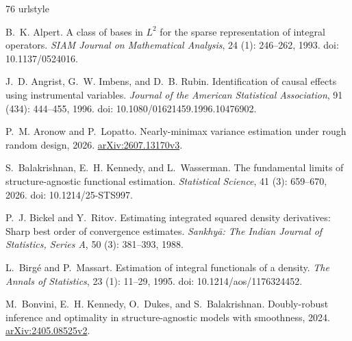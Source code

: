 \documentclass[12pt,oneside,openany]{book}
\numberwithin{equation}{chapter}
\theoremstyle{plain}
\theoremstyle{definition}
\theoremstyle{remark}
\begin{document}
\begin{thebibliography}{76}
\providecommand{\natexlab}[1]{#1}
\providecommand{\url}[1]{\texttt{#1}}
\expandafter\ifx\csname urlstyle\endcsname\relax
  \providecommand{\doi}[1]{doi: #1}\else
  \providecommand{\doi}{doi: \begingroup \urlstyle{rm}\Url}\fi

B.~K. Alpert.
\newblock A class of bases in {$L^2$} for the sparse representation of integral
  operators.
\newblock \emph{SIAM Journal on Mathematical Analysis}, 24
  (1): 246--262, 1993.
\newblock \doi{10.1137/0524016}.

J.~D. Angrist, G.~W. Imbens, and D.~B. Rubin.
\newblock Identification of causal effects using instrumental variables.
\newblock \emph{Journal of the American Statistical Association}, 91
  (434): 444--455, 1996.
\newblock \doi{10.1080/01621459.1996.10476902}.

P.~M. Aronow and P.~Lopatto.
\newblock Nearly-minimax variance estimation under rough random design, 2026.
\newblock \href{https://arxiv.org/abs/2607.13170v3}{arXiv:2607.13170v3}.

S.~Balakrishnan, E.~H. Kennedy, and L.~Wasserman.
\newblock The fundamental limits of structure-agnostic functional estimation.
\newblock \emph{Statistical Science}, 41 (3): 659--670, 2026.
\newblock \doi{10.1214/25-STS997}.

P.~J. Bickel and Y.~Ritov.
\newblock Estimating integrated squared density derivatives: Sharp best order
  of convergence estimates.
\newblock \emph{Sankhy{\=a}: The Indian Journal of Statistics, Series A},
  50 (3): 381--393, 1988.

L.~Birg{\'e} and P.~Massart.
\newblock Estimation of integral functionals of a density.
\newblock \emph{The Annals of Statistics}, 23 (1): 11--29,
  1995.
\newblock \doi{10.1214/aos/1176324452}.

M.~Bonvini, E.~H. Kennedy, O.~Dukes, and S.~Balakrishnan.
\newblock Doubly-robust inference and optimality in structure-agnostic models
  with smoothness, 2024.
\newblock \href{https://arxiv.org/abs/2405.08525v2}{arXiv:2405.08525v2}.


\end{thebibliography}
\end{document}
